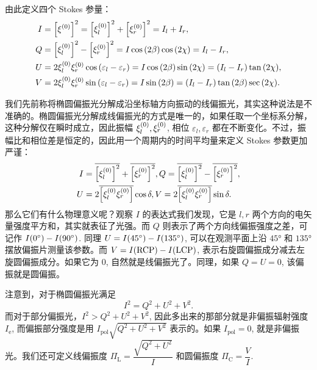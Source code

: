 \documentclass[../天体物理基础.tex]{subfiles}
\begin{document}
由此定义四个 Stokes 参量：
\begin{align}
I&=\mleft[\xi^{\mleft(0\mright)}\mright]^{2}=
\mleft[\xi_{l}^{\mleft(0\mright)}\mright]^{2}+\mleft[\xi_{r}^{\mleft(0\mright)}\mright]^{2}=I_{l}+I_{r},\\
Q&=\mleft[\xi_{l}^{\mleft(0\mright)}\mright]^{2}-\mleft[\xi_{r}^{\mleft(0\mright)}\mright]^{2}=I\cos{\mleft(2\beta\mright)}\cos{\mleft(2\chi\mright)}=I_{l}-I_{r},\\
U&=2\xi_{l}^{\mleft(0\mright)}\xi_{r}^{\mleft(0\mright)}\cos{\mleft(\varepsilon_{l}-\varepsilon_{r}\mright)}=I\cos{\mleft(2\beta\mright)}\sin{\mleft(2\chi\mright)}=\mleft(I_{l}-I_{r}\mright)\tan{\mleft(2\chi\mright)},\\
V&=2\xi_{l}^{\mleft(0\mright)}\xi_{r}^{\mleft(0\mright)}\sin{\mleft(\varepsilon_{l}-\varepsilon_{r}\mright)}=I\sin{\mleft(2\beta\mright)}=\mleft(I_{l}-I_{r}\mright)\tan{\mleft(2\beta\mright)}\sec{\mleft(2\chi\mright)}.
\end{align}

我们先前称将椭圆偏振光分解成沿坐标轴方向振动的线偏振光，其实这种说法是不准确的。椭圆偏振光分解成线偏振光的方式是唯一的，如果任取一个坐标系分解，这种分解仅在瞬时成立，因此振幅 $\xi_{l}^{\mleft(0\mright)},\xi_{r}^{\mleft(0\mright)}$, 相位 $\varepsilon_{l},\varepsilon_{r}$ 都在不断变化。不过，振幅比和相位差是恒定的，因此用一个周期内的时间平均量来定义 Stokes 参数更加严谨：
\begin{align}
I&=\overline{\mleft[\xi_{l}^{\mleft(0\mright)}\mright]^{2}}+\overline{\mleft[\xi_{r}^{\mleft(0\mright)}\mright]^{2}}, Q=\overline{\mleft[\xi_{l}^{\mleft(0\mright)}\mright]^{2}}-\overline{\mleft[\xi_{r}^{\mleft(0\mright)}\mright]^{2}},\notag\\
U&=2\overline{\mleft[\xi_{l}^{\mleft(0\mright)}\xi_{r}^{\mleft(0\mright)}\mright]}\cos{\delta}, V=2\overline{\mleft[\xi_{l}^{\mleft(0\mright)}\xi_{r}^{\mleft(0\mright)}\mright]}\sin{\delta}.\notag
\end{align}
那么它们有什么物理意义呢？观察 $I$ 的表达式我们发现，它是 $l, r$ 两个方向的电矢量强度平方和，其实就表征了光强。而 $Q$ 则表示了两个方向线偏振强度之差，可记作 $I\mleft(\ang{0;;}\mright)-I\mleft(\ang{90;;}\mright)$. 同理 $U=I\mleft(\ang{45;;}\mright)-I\mleft(\ang{135;;}\mright)$, 可以在观测平面上沿 $\ang{45;;}$ 和 $\ang{135;;}$ 摆放偏振片测量该参数。而 $V=I\mleft(\mathrm{RCP}\mright)-I\mleft(\mathrm{LCP}\mright)$, 表示右旋圆偏振成分减去左旋圆偏振成分。如果它为 0, 自然就是线偏振光了。同理，如果 $Q=U=0$, 该偏振就是圆偏振。

注意到，对于椭圆偏振光满足
\begin{equation}
I^{2}=Q^{2}+U^{2}+V^{2}.
\end{equation}
而对于部分偏振光，$I^{2}>Q^{2}+U^{2}+V^{2}$, 因此多出来的那部分就是非偏振辐射强度 $I_{\mathrm{e}}$, 而偏振部分强度是用 $I_{\mathrm{pol}}\sqrt{Q^{2}+U^{2}+V^{2}}$ 表示的。如果 $I_{\mathrm{pol}}=0$, 就是非偏振光。我们还可定义线偏振度 $\Pi_{\mathrm{L}}=\dfrac{\sqrt{Q^{2}+U^{2}}}{I}$ 和圆偏振度 $\Pi_{\mathrm{C}}=\dfrac{V}{I}$.
\end{document}
